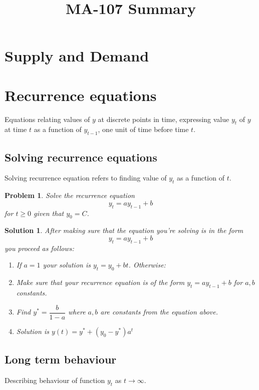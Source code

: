 \documentclass[11pt,a4paper]{article}
\theoremstyle{break}
\newtheorem*{problem}{Problem}
\theoremstyle{break}
\newtheorem*{solution}{Solution}
\begin{document}
\title{MA-107 Summary}
\date{}
\maketitle

\section{Supply and Demand}

\section{Recurrence equations}
Equations relating values of $y$ at discrete points in time, expressing value $y_{t}$ of $y$ at time $t$ as a function of $y_{t-1}$, one unit of time before time $t$.

\subsection{Solving recurrence equations}
Solving recurrence equation refers to finding value of $y_{t}$ as a function of ${t}$.
			
\begin{problem}
Solve the recurrence equation \[y_{t} = ay_{t-1} + b\] for $t \geq 0$ given that $y_{0} = C$.
\end{problem}

\begin{solution}
After making sure that the equation you're solving is in the form \[y_{t} = ay_{t-1} + b\] you proceed as follows:
\begin{enumerate}
\item If $a = 1$ your solution is $y_{t} = y_{0} + bt$. Otherwise:
\item Make sure that your recurrence equation is of the form $y_{t} = ay_{t-1} + b$ for $a, b$ constants.
\item Find $y^{\ast} = \dfrac{b}{1-a}$ where $a, b$ are constants from the equation above.
\item Solution is $y(t) = y^{\ast} + (y_{0} - y^{\ast})a^{t}$
\end{enumerate}
\end{solution}

\subsection{Long term behaviour}
Describing behaviour of function $y_{t}$ as $t \rightarrow \infty$.
\end{document}
